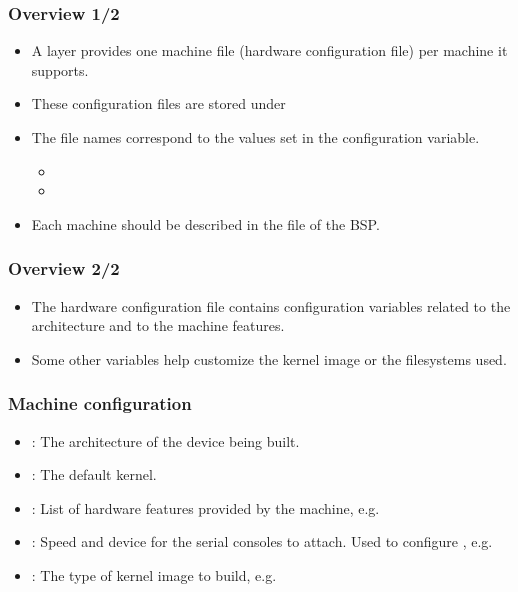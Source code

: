 \begin{frame}
  \frametitle{Overview 1/2}
  \begin{itemize}
    \item A layer provides one machine file (hardware configuration
      file) per machine it supports.
    \item These configuration files are stored under
    \item The file names correspond to the values set in the
       configuration variable.
      \begin{itemize}
        \item {}
        \item {}
      \end{itemize}
    \item Each machine should be described in the  file
      of the BSP.
  \end{itemize}
\end{frame}

\begin{frame}
  \frametitle{Overview 2/2}
  \begin{itemize}
    \item The hardware configuration file contains configuration
      variables related to the architecture and to the machine
      features.
    \item Some other variables help customize the kernel image or the
      filesystems used.
  \end{itemize}
\end{frame}

\begin{frame}
  \frametitle{Machine configuration}
  \begin{itemize}
    \item {}: The architecture of the device being built.
    \item {}: The default kernel.
    \item {}: List of hardware features provided by the
      machine, e.g. 
    \item {}: Speed and device for the serial consoles to
            attach. Used to configure ,
      e.g. 
    \item {}: The type of kernel image to build, e.g.
  \end{itemize}
\end{frame}

